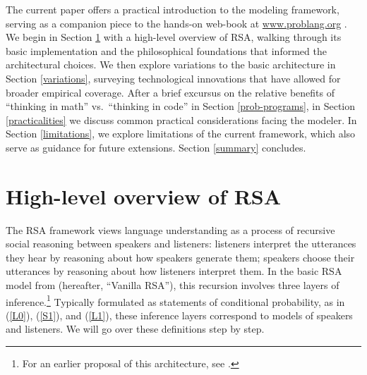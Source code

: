 \documentclass{sp}
\begin{document}
The current paper offers a practical introduction to the modeling framework, serving as a companion piece to the hands-on web-book at \href{https://www.problang.org}{www.problang.org} \citep{problang}. We begin in Section \ref{overview} with a high-level overview of RSA, walking through its basic implementation and the philosophical foundations that informed the architectural choices. We then explore variations to the basic architecture in Section \ref{variations}, surveying technological innovations that have allowed for broader empirical coverage. After a brief excursus on the relative benefits of ``thinking in math'' vs.~``thinking in code'' in Section \ref{prob-programs}, in Section \ref{practicalities} we discuss common practical considerations facing the modeler. In Section \ref{limitations}, we explore limitations of the current framework, which also serve as guidance for future extensions. Section \ref{summary} concludes.


\section{High-level overview of RSA} \label{overview}

The RSA framework views language understanding as a process of recursive social reasoning between speakers and listeners: listeners interpret the utterances they hear by reasoning about how speakers generate them; speakers choose their utterances by reasoning about how listeners interpret them. In the basic RSA model from \cite{frankgoodman2012} (hereafter, ``Vanilla RSA''), this recursion involves three layers of inference.\footnote{For an earlier proposal of this architecture, see \cite{BenzvanRooijOptimalAssertions2007}.} Typically formulated as statements of conditional probability, as in (\ref{L0}), (\ref{S1}), and (\ref{L1}), these inference layers correspond to models of speakers and listeners. We will go over these definitions step by step.
\end{document}
